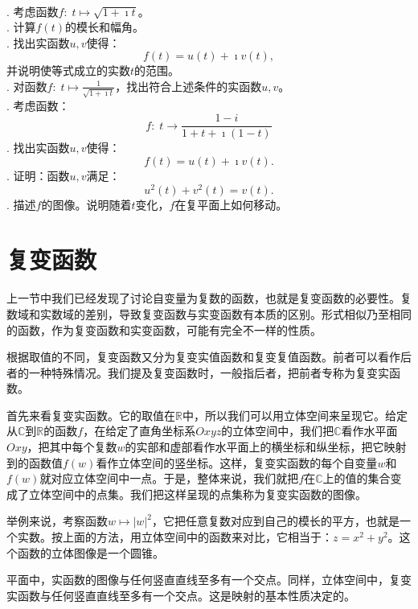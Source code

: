 \documentclass[12pt,UTF8,fontset=none]{ctexbook}
\begin{document}
\begin{xt}
    \mbox{} \\
    . 考虑函数$f:\; t\mapsto \sqrt{1 + \imath t}$。\\
    . 计算$f(t)$的模长和幅角。\\
    . 找出实函数$u,v$使得：
    $$ f(t) = u(t) + \imath v(t), $$
    \indent 并说明使等式成立的实数$t$的范围。\\
    . 对函数$f:\;t\mapsto \frac{1}{\sqrt{1 + \imath t}}$，找出符合上述条件的实函数$u,v$。\\
    . 考虑函数：
    $$ f:\; t \to \frac{1 - i}{1 + t + \imath(1 - t)}$$
    . 找出实函数$u,v$使得：
    $$ f(t) = u(t) + \imath v(t). $$
    . 证明：函数$u,v$满足：
    $$ u^2(t) + v^2(t) = v(t).$$
    . 描述$f$的图像。说明随着$t$变化，$f$在复平面上如何移动。

\end{xt}

\section{复变函数}

上一节中我们已经发现了讨论自变量为复数的函数，也就是复变函数的必要性。复数域和实数域的差别，导致复变函数与实变函数有本质的区别。形式相似乃至相同的函数，作为复变函数和实变函数，可能有完全不一样的性质。

根据取值的不同，复变函数又分为复变实值函数和复变复值函数。前者可以看作后者的一种特殊情况。我们提及复变函数时，一般指后者，把前者专称为复变实函数。

首先来看复变实函数。它的取值在$\mathbb{R}$中，所以我们可以用立体空间来呈现它。给定从$\mathbb{C}$到$\mathbb{R}$的函数$f$，在给定了直角坐标系$Oxyz$的立体空间中，我们把$\mathbb{C}$看作水平面$Oxy$，把其中每个复数$w$的实部和虚部看作水平面上的横坐标和纵坐标，把它映射到的函数值$f(w)$看作立体空间的竖坐标。这样，复变实函数的每个自变量$w$和$f(w)$就对应立体空间中一点。于是，整体来说，我们就把$f$在$\mathbb{C}$上的值的集合变成了立体空间中的点集。我们把这样呈现的点集称为复变实函数的图像。

举例来说，考察函数$w\mapsto |w|^2$，它把任意复数对应到自己的模长的平方，也就是一个实数。按上面的方法，用立体空间中的函数来对比，它相当于：$z = x^2 + y^2$。这个函数的立体图像是一个圆锥。

平面中，实函数的图像与任何竖直直线至多有一个交点。同样，立体空间中，复变实函数与任何竖直直线至多有一个交点。这是映射的基本性质决定的。
\end{document}
